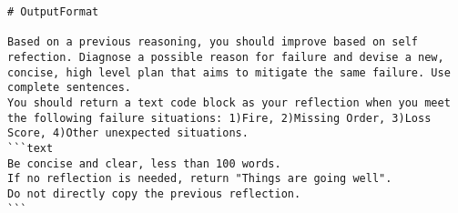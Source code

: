\begin{lstlisting}
# OutputFormat

Based on a previous reasoning, you should improve based on self refection. Diagnose a possible reason for failure and devise a new, concise, high level plan that aims to mitigate the same failure. Use complete sentences.
You should return a text code block as your reflection when you meet the following failure situations: 1)Fire, 2)Missing Order, 3)Loss Score, 4)Other unexpected situations.
```text
Be concise and clear, less than 100 words.
If no reflection is needed, return "Things are going well".
Do not directly copy the previous reflection.
```
\end{lstlisting}
